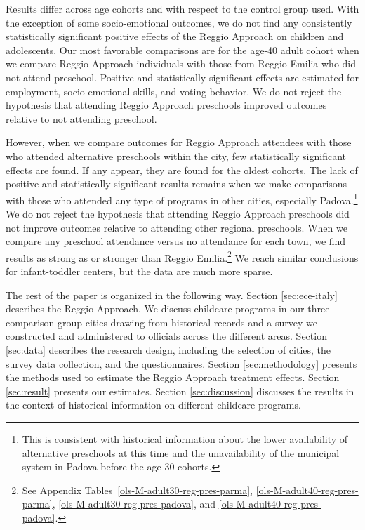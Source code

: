 Results differ across age cohorts and with respect to the control group used. With the exception of some socio-emotional outcomes, we do not find any consistently statistically significant positive effects of the Reggio Approach on children and adolescents. Our most favorable comparisons are for the age-40 adult cohort when we compare Reggio Approach individuals with those from Reggio Emilia who did not attend preschool. Positive and statistically significant effects are estimated for employment, socio-emotional skills, and voting behavior. We do not reject the hypothesis that attending Reggio Approach preschools improved outcomes relative to not attending preschool.

However, when we compare outcomes for Reggio Approach attendees with those who attended alternative preschools within the city, few statistically significant effects are found. If any appear, they are found for the oldest cohorts. The lack of positive and statistically significant results remains when we make comparisons with those who attended any type of programs in other cities, especially Padova.\footnote{This is consistent with historical information about the lower availability of alternative preschools at this time and the unavailability of the municipal system in Padova before the age-30 cohorts.} We do not reject the hypothesis that attending Reggio Approach preschools did not improve outcomes relative to attending other regional preschools. When we compare any preschool attendance versus no attendance for each town, we find results as strong as or stronger than Reggio Emilia.\footnote{See Appendix Tables~\ref{ols-M-adult30-reg-pres-parma}, \ref{ols-M-adult40-reg-pres-parma}, \ref{ols-M-adult30-reg-pres-padova}, and \ref{ols-M-adult40-reg-pres-padova}.} We reach similar conclusions for infant-toddler centers, but the data are much more sparse.

The rest of the paper is organized in the following way. Section \ref{sec:ece-italy} describes the Reggio Approach. We discuss childcare programs in our three comparison group cities drawing from historical records and a survey we constructed and administered to officials across the different areas. Section \ref{sec:data} describes the research design, including the selection of cities, the survey data collection, and the questionnaires. Section \ref{sec:methodology} presents the methods used to estimate the Reggio Approach treatment effects. Section \ref{sec:result} presents our estimates. Section \ref{sec:discussion} discusses the results in the context of historical information on different childcare programs.

